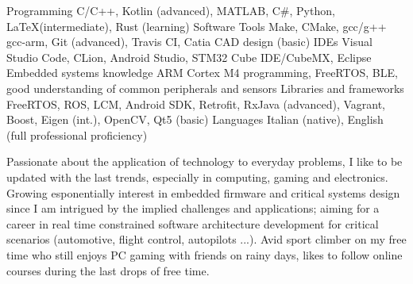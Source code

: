 \vspace*{-16pt}
\begin{cventries}
    
    \begin{cvskills}
        \cvskill
        {Programming}
        {C/C++, Kotlin (advanced), MATLAB, C\#, Python, \LaTeX (intermediate), Rust (learning)}
        \cvskill
        {Software Tools}
        {Make, CMake, gcc/g++ gcc-arm, Git (advanced), Travis CI, Catia CAD design (basic)}
        \cvskill
        {IDEs}
        {Visual Studio Code, CLion, Android Studio, STM32 Cube IDE/CubeMX, Eclipse}
        \cvskill
        {Embedded systems knowledge}
        {ARM Cortex M4 programming, FreeRTOS, BLE, good understanding \linebreak of common peripherals and sensors}
        \cvskill
        {Libraries and frameworks}
        {FreeRTOS, ROS, LCM, Android SDK, Retrofit, RxJava (advanced), Vagrant, Boost, Eigen (int.), \linebreak OpenCV, Qt5 (basic)}
        \cvskill
        {Languages}
        {Italian (native), English (full professional proficiency)}
    \end{cvskills}

\end{cventries}

\begin{cvparagraph}
   Passionate about the application of technology to everyday problems, I like to be updated with the last trends, especially in computing, gaming and electronics. 
   Growing esponentially interest in embedded firmware and critical systems design since I am intrigued by the implied challenges and applications; aiming for a career in real time constrained software architecture development for critical scenarios (automotive, flight control, autopilots ...).
   Avid sport climber on my free time who still enjoys PC gaming with friends on rainy days, likes to follow online courses during the last drops of free time.
\end{cvparagraph}
